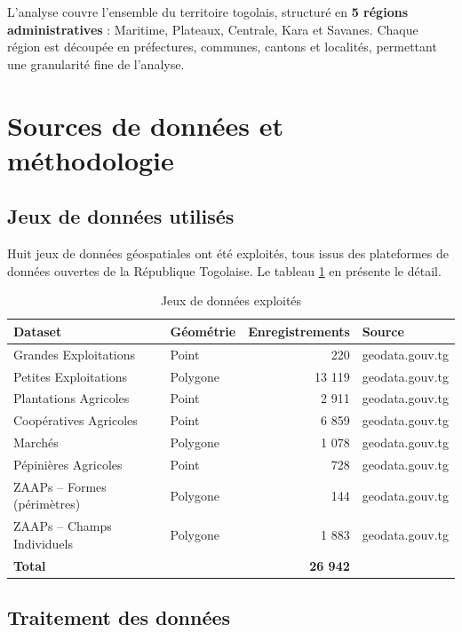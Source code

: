 \documentclass[12pt, a4paper]{article}
\begin{document}
L'analyse couvre l'ensemble du territoire togolais, structuré en \textbf{5 régions administratives} :
Maritime, Plateaux, Centrale, Kara et Savanes. Chaque région est découpée en préfectures, communes,
cantons et localités, permettant une granularité fine de l'analyse.

\section{Sources de données et méthodologie}

\subsection{Jeux de données utilisés}

Huit jeux de données géospatiales ont été exploités, tous issus des plateformes de données ouvertes
de la République Togolaise. Le tableau \ref{tab:datasets} en présente le détail.

\begin{table}[H]
\centering
\caption{Jeux de données exploités}
\label{tab:datasets}
\renewcommand{\arraystretch}{1.3}
\begin{tabular}{p{5cm} p{3cm} r p{3.5cm}}
\toprule
\textbf{Dataset} & \textbf{Géométrie} & \textbf{Enregistrements} & \textbf{Source} \\
\midrule
Grandes Exploitations & Point & 220 & geodata.gouv.tg \\
Petites Exploitations & Polygone & 13 119 & geodata.gouv.tg \\
Plantations Agricoles & Point & 2 911 & geodata.gouv.tg \\
Coopératives Agricoles & Point & 6 859 & geodata.gouv.tg \\
Marchés & Polygone & 1 078 & geodata.gouv.tg \\
Pépinières Agricoles & Point & 728 & geodata.gouv.tg \\
ZAAPs -- Formes (périmètres) & Polygone & 144 & geodata.gouv.tg \\
ZAAPs -- Champs Individuels & Polygone & 1 883 & geodata.gouv.tg \\
\midrule
\textbf{Total} & & \textbf{26 942} & \\
\bottomrule
\end{tabular}
\end{table}

\subsection{Traitement des données}
\end{document}
